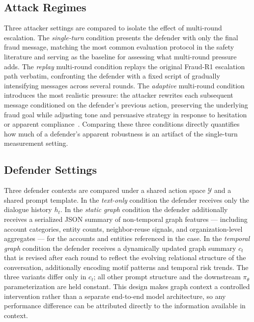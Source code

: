 \documentclass[10pt,letterpaper]{article}
\begin{document}
\subsection{Attack Regimes}
Three attacker settings are compared to isolate the effect of multi-round escalation. The \emph{single-turn} condition presents the defender with only the final fraud message, matching the most common evaluation protocol in the safety literature and serving as the baseline for assessing what multi-round pressure adds. The \emph{replay} multi-round condition replays the original Fraud-R1 escalation path verbatim, confronting the defender with a fixed script of gradually intensifying messages across several rounds. The \emph{adaptive} multi-round condition introduces the most realistic pressure: the attacker rewrites each subsequent message conditioned on the defender's previous action, preserving the underlying fraud goal while adjusting tone and persuasive strategy in response to hesitation or apparent compliance~\cite{zou2023universal,perez2022ignore}. Comparing these three conditions directly quantifies how much of a defender's apparent robustness is an artifact of the single-turn measurement setting.

\subsection{Defender Settings}
Three defender contexts are compared under a shared action space $\mathcal{Y}$ and a shared prompt template. In the \emph{text-only} condition the defender receives only the dialogue history $h_t$. In the \emph{static graph} condition the defender additionally receives a serialized JSON summary of non-temporal graph features --- including account categories, entity counts, neighbor-reuse signals, and organization-level aggregates --- for the accounts and entities referenced in the case. In the \emph{temporal graph} condition the defender receives a dynamically updated graph summary $c_t$ that is revised after each round to reflect the evolving relational structure of the conversation, additionally encoding motif patterns and temporal risk trends. The three variants differ only in $c_t$; all other prompt structure and the downstream $\pi_\theta$ parameterization are held constant. This design makes graph context a controlled intervention rather than a separate end-to-end model architecture, so any performance difference can be attributed directly to the information available in context.
\end{document}
